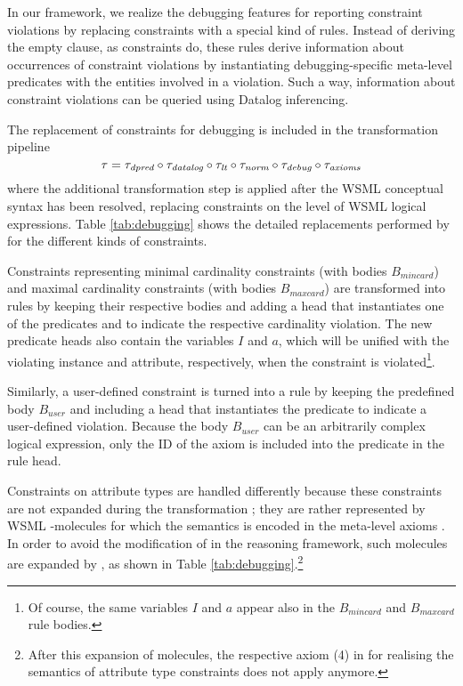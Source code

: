In our framework, we realize the debugging features for reporting constraint violations by replacing constraints with a special
kind of rules. Instead of deriving the empty clause, as
constraints do, these rules derive information about occurrences of
constraint violations by instantiating debugging-specific
meta-level predicates with the entities involved in a violation.
Such a way, information about constraint violations can be
queried using Datalog inferencing.

The replacement of constraints for debugging is included in the
transformation pipeline
\begin{displaymath}
    \tau = \tau_{\textit{\scriptsize{dpred}}} \circ \tau_{\textit{\scriptsize{datalog}}} \circ \tau_{\textit{\scriptsize{lt}}} \circ \tau_{\textit{\scriptsize{norm}}} \circ \tau_{\textit{\scriptsize{debug}}} \circ \tau_{\textit{\scriptsize{axioms}}}
\end{displaymath}
where the additional transformation step \transdebug is applied
after the WSML conceptual syntax has been resolved, replacing
constraints on the level of WSML logical expressions. Table
\ref{tab:debugging} shows the detailed replacements performed by
\transdebug for the different kinds of constraints.

Constraints representing minimal cardinality constraints (with bodies $B_{mincard}$) and maximal cardinality constraints (with bodies $B_{maxcard}$) are transformed into rules by keeping their respective
bodies and adding a head that instantiates one of the predicates
\pvmincard and \pvmaxcard to indicate the respective cardinality
violation. The new predicate heads also contain the variables $I$ and $a$, which will be unified with the violating instance and attribute, respectively, when the constraint is violated\footnote{Of course, the same variables $I$ and $a$ appear also in the $B_{mincard}$ and $B_{maxcard}$ rule bodies.}.

Similarly, a user-defined constraint is turned into a rule by
keeping the predefined body $B_{user}$ and including a head that
instantiates the predicate \pvuser to indicate a user-defined
violation. Because the body $B_{user}$ can be an arbitrarily complex
logical expression, only the \axiomid ID of the axiom is included into the predicate in the rule head.

Constraints on attribute types are handled differently
because these constraints are not expanded during the
transformation \transax ; they are rather represented by WSML
-molecules for which the semantics is encoded in the
meta-level axioms \mlaxioms. In order to avoid the modification of
\mlaxioms in the reasoning framework, such molecules are expanded
by \transdebug, as shown in Table
\ref{tab:debugging}.\footnote{After this expansion of
 molecules, the respective axiom (4) in \mlaxioms for
realising the semantics of attribute type constraints does not
apply anymore.}

